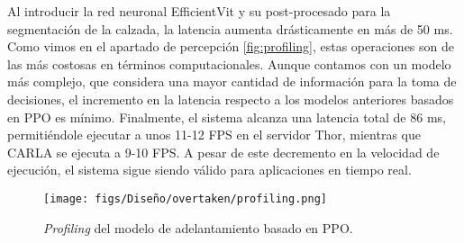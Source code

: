Al introducir la red neuronal EfficientVit y su post-procesado para la segmentación de la calzada, la latencia aumenta drásticamente en más de 50 ms. Como vimos en el apartado de percepción \ref{fig:profiling}, estas operaciones son de las más costosas en términos computacionales. Aunque contamos con un modelo más complejo, que considera una mayor cantidad de información para la toma de decisiones, el incremento en la latencia respecto a los modelos anteriores basados en \ac{PPO} es mínimo. Finalmente, el sistema alcanza una latencia total de 86 ms, permitiéndole ejecutar a unos 11-12 \ac{FPS} en el servidor Thor, mientras que CARLA se ejecuta a 9-10 \ac{FPS}. A pesar de este decremento en la velocidad de ejecución, el sistema sigue siendo válido para aplicaciones en tiempo real.
\begin{figure}[ht]
\centering
\texttt{[image: figs/Diseño/overtaken/profiling.png]}
\caption{\textit{Profiling} del modelo de adelantamiento basado en \ac{PPO}.}
\label{fig:profiling_overtaken}
\end{figure}


